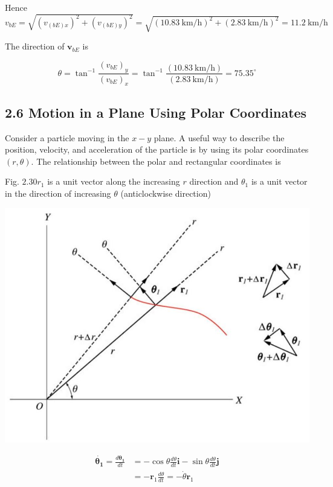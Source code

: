 \documentclass[10pt]{article}
\begin{document}
Hence\\
$v_{b E}=\sqrt{\left(v_{(b E) x}\right)^{2}+\left(v_{(b E) y}\right)^{2}}=\sqrt{(10.83 \mathrm{~km} / \mathrm{h})^{2}+(2.83 \mathrm{~km} / \mathrm{h})^{2}}=11.2 \mathrm{~km} / \mathrm{h}$

The direction of $\mathbf{v}_{b E}$ is

$$
\theta=\tan ^{-1} \frac{\left(v_{b E}\right)_{y}}{\left(v_{b E}\right)_{x}}=\tan ^{-1} \frac{(10.83 \mathrm{~km} / \mathrm{h})}{(2.83 \mathrm{~km} / \mathrm{h})}=75.35^{\circ}
$$

\subsection*{2.6 Motion in a Plane Using Polar Coordinates}
Consider a particle moving in the $x-y$ plane. A useful way to describe the position, velocity, and acceleration of the particle is by using its polar coordinates $(r, \theta)$. The relationship between the polar and rectangular coordinates is

Fig. $2.30 r_{1}$ is a unit vector along the increasing $r$ direction and $\theta_{1}$ is a unit vector in the direction of increasing $\theta$ (anticlockwise direction)

\begin{center}
\includegraphics[max width=\textwidth]{2024_09_13_db1f357d2aad0a03eb2eg-043}
\end{center}

$$
\begin{aligned}
\dot{\boldsymbol{\theta}_{\mathbf{1}}}=\frac{d \boldsymbol{\theta}_{\mathbf{1}}}{d t} & =-\cos \theta \frac{d \theta}{d t} \mathbf{i}-\sin \theta \frac{d \theta}{d t} \mathbf{j} \\
& =-\mathbf{r}_{1} \frac{d \theta}{d t}=-\dot{\theta} \mathbf{r}_{1}
\end{aligned}
$$
\end{document}
